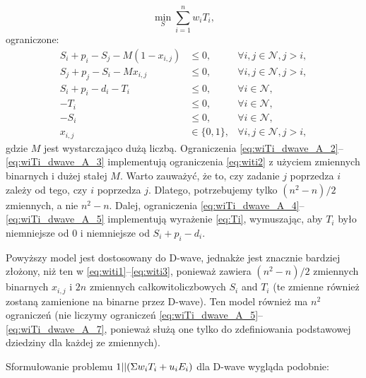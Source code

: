 \begin{equation}\label{eq:wiTi_dwave_A_1}
    \min_S \sum_{i=1}^n w_i T_i ,
\end{equation}
%
ograniczone:
%
\begin{align}
    S_i + p_i - S_j - M(1-x_{i,j}) & \leq{} 0, & \forall{}i,j\in{}\mathcal{N},j>i, \label{eq:wiTi_dwave_A_2} \\
    S_j + p_j - S_i - Mx_{i,j} & \leq{} 0, & \forall{}i,j\in{}\mathcal{N},j>i, \label{eq:wiTi_dwave_A_3} \\
    S_i+p_i-d_i-T_i & \leq{} 0, & \forall{}i\in{}\mathcal{N}, \label{eq:wiTi_dwave_A_4} \\
    -T_i & \leq{} 0, & \forall{}i\in{}\mathcal{N}, \label{eq:wiTi_dwave_A_5} \\
    -S_i & \leq{} 0, & \forall{}i\in{}\mathcal{N}, \label{eq:wiTi_dwave_A_6} \\
    x_{i,j} & \in \{0,1\}, & \forall{}i,j\in{}\mathcal{N},j>i, \label{eq:wiTi_dwave_A_7}
\end{align}
%
gdzie $M$ jest wystarczająco dużą liczbą. Ograniczenia \eqref{eq:wiTi_dwave_A_2}--\eqref{eq:wiTi_dwave_A_3} implementują ograniczenia \eqref{eq:witi2} z użyciem zmiennych binarnych i dużej stałej $M$. Warto zauważyć, że to, czy zadanie $j$ poprzedza $i$ zależy od tego, czy $i$ poprzedza $j$. Dlatego, potrzebujemy tylko $(n^2-n)/2$ zmiennych, a nie $n^2-n$. Dalej, ograniczenia \eqref{eq:wiTi_dwave_A_4}--\eqref{eq:wiTi_dwave_A_5} implementują wyrażenie \eqref{eq:Ti}, wymuszając, aby $T_i$ było niemniejsze od 0 i niemniejsze od $S_i+p_i-d_i$.

Powyższy model jest dostosowany do D-wave, jednakże jest znacznie bardziej złożony, niż ten w \eqref{eq:witi1}--\eqref{eq:witi3}, ponieważ zawiera $(n^2-n)/2$ zmiennych binarnych $x_{i,j}$ i $2n$ zmiennych całkowitoliczbowych $S_i$ and $T_i$ (te zmienne również zostaną zamienione na binarne przez D-wave). Ten model również ma $n^2$ ograniczeń (nie liczymy ograniczeń \eqref{eq:wiTi_dwave_A_5}--\eqref{eq:wiTi_dwave_A_7}, ponieważ służą one tylko do zdefiniowania podstawowej dziedziny dla każdej ze zmiennych).

Sformułowanie problemu $1||(\Sigma{}w_i T_i+u_i E_i)$ dla D-wave wygląda podobnie:

